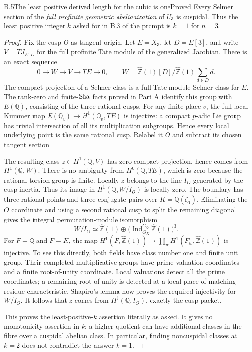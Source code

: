 \begin{statement}{B.5}{The least positive derived length for the cubic is one}{Proved}
Every Selmer section of the \emph{full profinite geometric
abelianization} of $U_3$ is cuspidal. Thus the least positive integer
$k$ asked for in B.3 of the prompt is $k=1$ for $n=3$.
\end{statement}
\begin{proof}
Fix the cusp $O$ as tangent origin. Let $E=X_3$, let $D=E[3]$, and
write $V=TJ_{E,D}$ for the full profinite Tate module of the generalized
Jacobian. There is an exact sequence
\[
 0\longrightarrow W\longrightarrow V\longrightarrow TE
 \longrightarrow0,\qquad
 W=\widehat{\mathbb Z}(1)[D]/\widehat{\mathbb Z}(1)\sum_{d\in D}d.
\]
The compact projection of a Selmer class is a full Tate-module Selmer
class for $E$. The rank-zero and finite-$\mathop{\mathrm{Sha}}$ facts proved in Part A
identify this group with $E(\mathbb Q)$, consisting of the three
rational cusps. For any finite place $v$, the full local Kummer map
$E(\mathbb Q_v)\to H^1(\mathbb Q_v,TE)$ is injective: a compact
$p$-adic Lie group has trivial intersection of all its multiplication
subgroups. Hence every local underlying point is the same rational
cusp. Relabel it $O$ and subtract its chosen tangent section.

The resulting class $z\in H^1(\mathbb Q,V)$ has zero compact
projection, hence comes from $H^1(\mathbb Q,W)$. There is no ambiguity
from $H^0(\mathbb Q,TE)$, which is zero because the rational torsion
group is finite. Locally $z$ belongs to the line $I_O$ generated by
the cusp inertia. Thus its image in $H^1(\mathbb Q,W/I_O)$ is locally
zero. The boundary has three rational points and three conjugate
pairs over $K=\mathbb Q(\zeta_3)$. Eliminating the $O$ coordinate and
using a second rational cusp to split the remaining diagonal gives
the integral permutation-module isomorphism
\[
 W/I_O\simeq\widehat{\mathbb Z}(1)
 \oplus\bigl(\operatorname{Ind}_{G_K}^{G_{\mathbb Q}}
                  \widehat{\mathbb Z}(1)\bigr)^3.
\]
For $F=\mathbb Q$ and $F=K$, the map
$H^1(F,\widehat{\mathbb Z}(1))\to\prod_w
H^1(F_w,\widehat{\mathbb Z}(1))$ is injective. To see this directly,
both fields have class number one and finite unit group. Their
completed multiplicative groups have prime-valuation coordinates and
a finite root-of-unity coordinate. Local valuations detect all the
prime coordinates; a remaining root of unity is detected at a local
place of matching residue characteristic. Shapiro's lemma now proves
the required injectivity for $W/I_O$. It follows that $z$ comes from
$H^1(\mathbb Q,I_O)$, exactly the cusp packet.

This proves the least-positive-$k$ assertion literally as asked.
It gives no monotonicity assertion in $k$: a higher quotient can have
additional classes in the fibre over a cuspidal abelian class. In
particular, finding noncuspidal classes at $k=2$ does not contradict
the answer $k=1$.
\end{proof}

